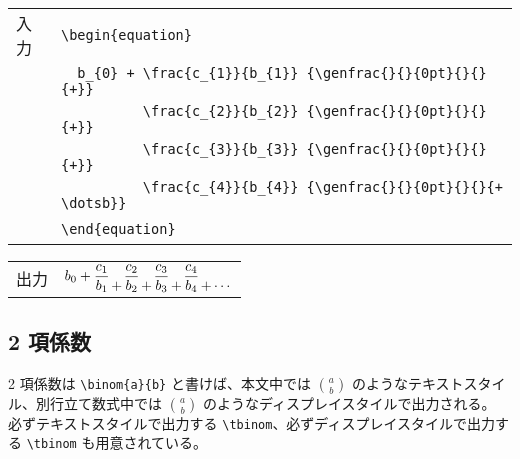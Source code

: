 \begin{longtable}[l]{@{}l|l@{}}
  入力 & \verb`\begin{equation}`                                                \\
  \    & \verb`  b_{0} + \frac{c_{1}}{b_{1}} {\genfrac{}{}{0pt}{}{}{+}}`        \\
  \    & \verb`          \frac{c_{2}}{b_{2}} {\genfrac{}{}{0pt}{}{}{+}}`        \\
  \    & \verb`          \frac{c_{3}}{b_{3}} {\genfrac{}{}{0pt}{}{}{+}}`        \\
  \    & \verb`          \frac{c_{4}}{b_{4}} {\genfrac{}{}{0pt}{}{}{+ \dotsb}}` \\
  \    & \verb`\end{equation}`                                                  \\
\end{longtable}
\begin{longtable}[l]{@{}l|l@{}}
  出力 & $\displaystyle{b_{0} + \frac{c_{1}}{b_{1}} {\genfrac{}{}{0pt}{}{}{+}}\frac{c_{2}}{b_{2}} {\genfrac{}{}{0pt}{}{}{+}}\frac{c_{3}}{b_{3}} {\genfrac{}{}{0pt}{}{}{+}}\frac{c_{4}}{b_{4}} {\genfrac{}{}{0pt}{}{}{+ \dotsb}}}$
\end{longtable}
\subsection{2 項係数}
2 項係数は \verb`\binom{a}{b}` と書けば、本文中では $\binom{a}{b}$ のようなテキストスタイル、別行立て数式中では $\displaystyle \binom{a}{b}$ のようなディスプレイスタイルで出力される。
必ずテキストスタイルで出力する \verb`\tbinom`、必ずディスプレイスタイルで\vspc{+2.00pt}出力する \verb`\tbinom` も用意されている。
